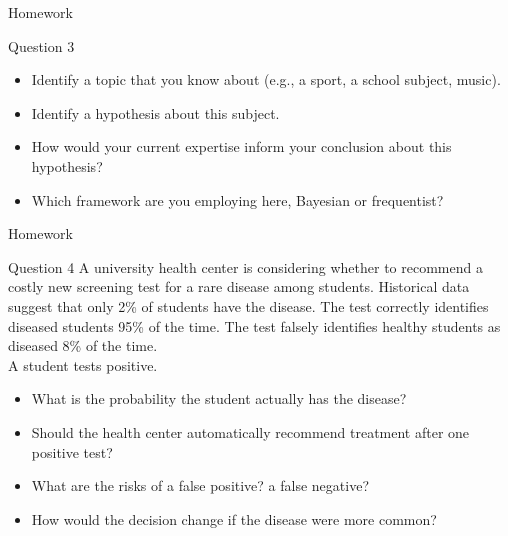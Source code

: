 \documentclass[12pt]{beamer}
\begin{document}
{%
\begin{frame}{Homework}
\begin{block}{Question 3
}
\begin{itemize}
\item[a.] Identify a topic that you know about (e.g., a sport, a school subject, music).
\item[b.] Identify a hypothesis about this subject.
\item[c.] How would your current expertise inform your conclusion about this hypothesis?
\item[d.] Which framework are you employing here, Bayesian or frequentist?
\end{itemize}
\end{block}
\end{frame}

\begin{frame}{Homework}
\begin{block}{Question 4}
A university health center is considering whether to recommend a costly new screening test for a rare disease among students.
Historical data suggest that only 2\% of students have the disease.
The test correctly identifies diseased students 95\% of the time.
The test falsely identifies healthy students as diseased 8\% of the time.
\\A student tests positive.
\begin{itemize}
\item[a.] What is the probability the student actually has the disease?
\item[b.] Should the health center automatically recommend treatment after one positive test?
\item[c.] What are the risks of a false positive? a false negative?
\item[d.] How would the decision change if the disease were more common?
\end{itemize}
\end{block}
\end{frame}

}
\end{document}
